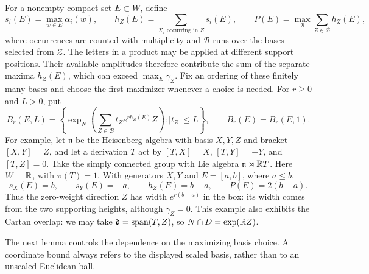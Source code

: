 For a nonempty compact set $E\subset W$, define
\begin{equation}\label{eq:support-exponents}
 s_i(E)=\max_{w\in E}\alpha_i(w),\qquad
 h_Z(E)=\sum_{X_i\text{ occurring in }Z}s_i(E),\qquad
 P(E)=\max_{\mathcal B}\sum_{Z\in\mathcal B}h_Z(E),
\end{equation}
where occurrences are counted with multiplicity and $\mathcal B$ runs
over the bases selected from $\mathcal Z$. The letters in a product may
be applied at different support positions. Their available amplitudes
therefore contribute the sum of the separate maxima $h_Z(E)$, which
can exceed $\max_E\gamma_Z$.
Fix an ordering of these
finitely many bases and choose the first maximizer whenever a choice is
needed. For $r\ge0$ and $L>0$, put
\begin{equation}\label{eq:weighted-box-definition}
 B_r(E,L)=\left\{\exp_N\left(\sum_{Z\in\mathcal B}
 t_Ze^{rh_Z(E)}Z\right): |t_Z|\le L\right\},
 \qquad B_r(E)=B_r(E,1).
\end{equation}
For example, let $\mathfrak n$ be the Heisenberg algebra with basis
$X,Y,Z$ and bracket $[X,Y]=Z$, and let a derivation $T$ act by
$[T,X]=X$, $[T,Y]=-Y$, and $[T,Z]=0$. Take the simply connected
group with Lie algebra $\mathfrak n\rtimes\mathbb R T$. Here $W=\mathbb R$, with
$\pi(T)=1$. With generators $X,Y$ and $E=[a,b]$, where $a\le b$,
\[
 s_X(E)=b,\qquad s_Y(E)=-a,\qquad h_Z(E)=b-a,
 \qquad P(E)=2(b-a).
\]
Thus the zero-weight direction $Z$ has width $e^{r(b-a)}$ in the box:
its width comes from the two supporting heights, although
$\gamma_Z=0$. This example also exhibits the Cartan overlap:
we may take $\mathfrak d=\operatorname{span}(T,Z)$, so
$N\cap D=\exp(\mathbb R Z)$.

The next lemma controls the dependence on the maximizing basis choice.
A coordinate bound always refers to the displayed scaled basis, rather
than to an unscaled Euclidean ball.

